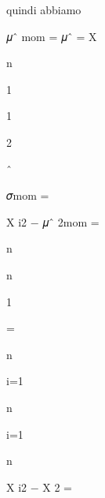 \documentclass[a4paper,portrait,12pt]{article}
\begin{document}
\begin{flushleft}
quindi abbiamo
\end{flushleft}


\begin{flushleft}
𝜇ˆ mom = 𝜇ˆ = X
\end{flushleft}


\begin{flushleft}
n
\end{flushleft}


1


1


2


ˆ


\begin{flushleft}
𝜎mom =
\end{flushleft}


\begin{flushleft}
X i2 $-$ 𝜇ˆ 2mom =
\end{flushleft}


\begin{flushleft}
n
\end{flushleft}


\begin{flushleft}
n
\end{flushleft}


1


=


\begin{flushleft}
n
\end{flushleft}





\begin{flushleft}
i=1
\end{flushleft}


\begin{flushleft}
n
\end{flushleft}


\begin{flushleft}
i=1
\end{flushleft}





\begin{flushleft}
n
\end{flushleft}





\begin{flushleft}
X i2 $-$ X 2 =
\end{flushleft}
\end{document}
